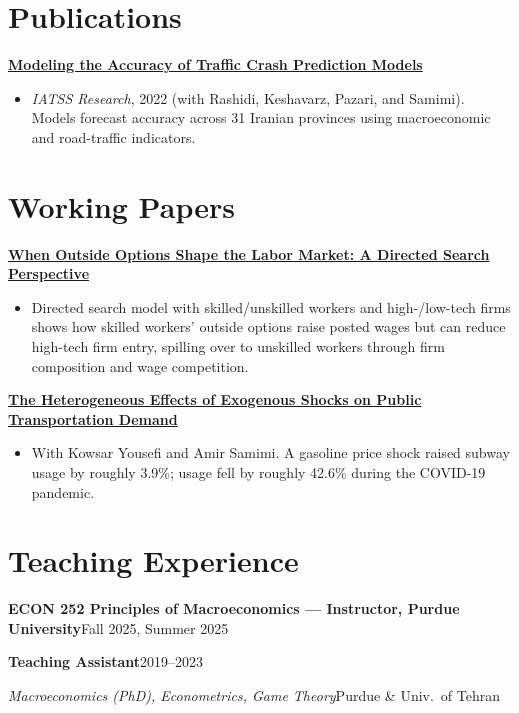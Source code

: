 \documentclass[10pt]{article}
\newcommand{\entry}[2]{%
  \needspace{2\baselineskip}%
  \textbf{#1}\hfill #2\par}
\newcommand{\role}[2]{\textit{#1}\hfill #2\par\vspace{0.1em}}
\newcommand{\paper}[1]{\needspace{2\baselineskip}\textbf{#1}\par\vspace{0.1em}}
\newenvironment{desc}
  {\begin{itemize}[leftmargin=1.1em,topsep=0.05em,itemsep=0.05em,parsep=0pt]}
  {\end{itemize}\vspace{0.25em}}
\begin{document}
\section{Publications}

\paper{\href{https://doi.org/10.1016/j.iatssr.2022.03.004}{Modeling the Accuracy of Traffic Crash Prediction Models}}
\begin{desc}
  \item \textit{IATSS Research}, 2022 (with Rashidi, Keshavarz, Pazari, and Samimi). Models forecast
  accuracy across 31 Iranian provinces using macroeconomic and road-traffic indicators.
\end{desc}

\section{Working Papers}

\paper{\href{https://dx.doi.org/10.2139/ssrn.6379739}{When Outside Options Shape the Labor Market: A Directed Search Perspective}}
\begin{desc}
  \item Directed search model with skilled/unskilled workers and high-/low-tech firms shows how
  skilled workers' outside options raise posted wages but can reduce high-tech firm entry,
  spilling over to unskilled workers through firm composition and wage competition.
\end{desc}

\paper{\href{https://dx.doi.org/10.2139/ssrn.4830956}{The Heterogeneous Effects of Exogenous Shocks on Public Transportation Demand}}
\begin{desc}
  \item With Kowsar Yousefi and Amir Samimi. A gasoline price shock raised subway usage by
  roughly 3.9\%; usage fell by roughly 42.6\% during the COVID-19 pandemic.
\end{desc}

\section{Teaching Experience}

\entry{ECON 252 Principles of Macroeconomics --- Instructor, Purdue University}{Fall 2025, Summer 2025}
\entry{Teaching Assistant}{2019--2023}
\role{Macroeconomics (PhD), Econometrics, Game Theory}{Purdue \& Univ.\ of Tehran}
\end{document}
